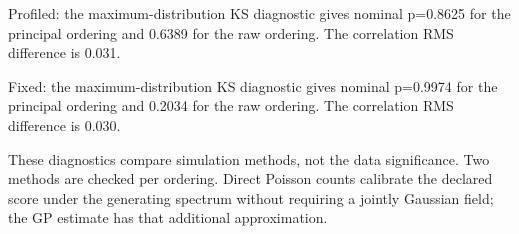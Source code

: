 Profiled: the maximum-distribution KS diagnostic gives nominal p=0.8625 for the principal ordering and 0.6389 for the raw ordering. The correlation RMS difference is 0.031.

Fixed: the maximum-distribution KS diagnostic gives nominal p=0.9974 for the principal ordering and 0.2034 for the raw ordering. The correlation RMS difference is 0.030.

These diagnostics compare simulation methods, not the data significance. Two methods are checked per ordering. Direct Poisson counts calibrate the declared score under the generating spectrum without requiring a jointly Gaussian field; the GP estimate has that additional approximation.
